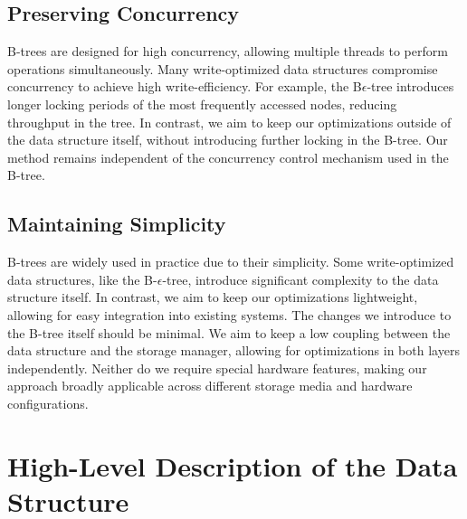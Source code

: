 \subsection*{Preserving Concurrency}
B-trees are designed for high concurrency, allowing multiple threads to perform operations simultaneously.
Many write-optimized data structures compromise concurrency to achieve high write-efficiency.
For example, the B$\epsilon$-tree introduces longer locking periods of the most frequently accessed nodes, reducing throughput in the tree.
In contrast, we aim to keep our optimizations outside of the data structure itself, without introducing further locking in the B-tree.
Our method remains independent of the concurrency control mechanism used in the B-tree.

\subsection*{Maintaining Simplicity}
B-trees are widely used in practice due to their simplicity.
Some write-optimized data structures, like the B-$\epsilon$-tree, introduce significant complexity to the data structure itself.
In contrast, we aim to keep our optimizations lightweight, allowing for easy integration into existing systems.
The changes we introduce to the B-tree itself should be minimal.
We aim to keep a low coupling between the data structure and the storage manager, allowing for optimizations in both layers independently.
Neither do we require special hardware features, making our approach broadly applicable across different storage media and hardware configurations.


\section{High-Level Description of the Data Structure}

